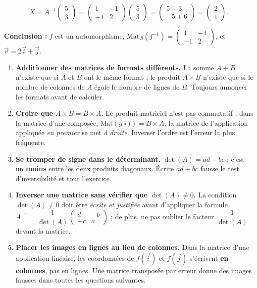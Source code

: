 \documentclass[11pt]{article}
\begin{document}
\begin{exoresolu}
\begin{enumerate}
\[ X=A^{-1}\begin{pmatrix} 5 \\ 3 \end{pmatrix}=\begin{pmatrix} 1 & -1 \\ -1 & 2 \end{pmatrix}\begin{pmatrix} 5 \\ 3 \end{pmatrix}=\begin{pmatrix} 5-3 \\ -5+6 \end{pmatrix}=\begin{pmatrix} 2 \\ 1 \end{pmatrix}. \]
\end{enumerate}
\textbf{Conclusion :} $f$ est un automorphisme, $\mathrm{Mat}_{\mathcal{B}}(f^{-1})=\begin{pmatrix} 1 & -1 \\ -1 & 2 \end{pmatrix}$, et $\vec{v}=2\vec{i}+\vec{j}$.
\end{exoresolu}

\begin{attention}
\begin{enumerate}
\item \textbf{Additionner des matrices de formats différents.} La somme $A+B$ n'existe que si $A$ et $B$ ont le même format ; le produit $A\times B$ n'existe que si le nombre de colonnes de $A$ égale le nombre de lignes de $B$. Toujours annoncer les formats avant de calculer.
\item \textbf{Croire que $A\times B=B\times A$.} Le produit matriciel n'est pas commutatif : dans la matrice d'une composée, $\mathrm{Mat}(g\circ f)=B\times A$, la matrice de l'application appliquée \emph{en premier} se met \emph{à droite}. Inverser l'ordre est l'erreur la plus fréquente.
\item \textbf{Se tromper de signe dans le déterminant.} $\det(A)=ad-bc$ : c'est un \textbf{moins} entre les deux produits diagonaux. Écrire $ad+bc$ fausse le test d'inversibilité et tout l'exercice.
\item \textbf{Inverser une matrice sans vérifier que $\det(A)\neq 0$.} La condition $\det(A)\neq 0$ doit être \emph{écrite et justifiée} avant d'appliquer la formule $A^{-1}=\dfrac{1}{\det(A)}\begin{pmatrix} d & -b \\ -c & a \end{pmatrix}$ ; de plus, ne pas oublier le facteur $\dfrac{1}{\det(A)}$ devant la matrice.
\item \textbf{Placer les images en lignes au lieu de colonnes.} Dans la matrice d'une application linéaire, les coordonnées de $f(\vec{i})$ et $f(\vec{j})$ s'écrivent \textbf{en colonnes}, pas en lignes. Une matrice transposée par erreur donne des images fausses dans toutes les questions suivantes.
\end{enumerate}
\end{attention}
\end{document}
